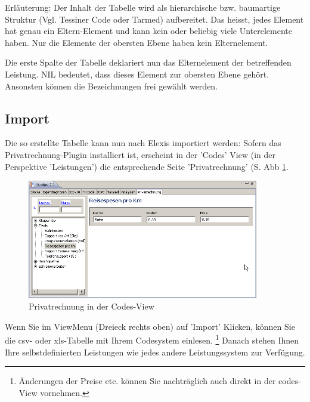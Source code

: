 \documentclass[a4paper]{scrartcl}
\begin{document}
\medskip

Erläuterung: Der Inhalt der Tabelle wird als hierarchische bzw. baumartige Struktur (Vgl. Tessiner Code oder Tarmed) aufbereitet. Das heisst, jedes Element hat genau ein Eltern-Element und kann kein oder beliebig viele Unterelemente haben. Nur die Elemente der obersten Ebene haben kein Elternelement.

Die erste Spalte der Tabelle deklariert nun das Elternelement der betreffenden Leistung. NIL bedeutet, dass dieses Element zur obersten Ebene gehört. Ansonsten können die Bezeichnungen frei gewählt werden.

\subsection{Import}
Die so erstellte Tabelle kann nun nach Elexis importiert werden: Sofern das Privatrechnung-Plugin installiert ist, erscheint in der 'Codes' View (in der Perspektive 'Leistungen') die entsprechende Seite 'Privatrechnung' (S. Abb \ref{fig:privatrechnung1}.

\begin{figure}
  \center
  \includegraphics[width=0.9\textwidth]{privatrechnung1}
  \caption{Privatrechnung in der Codes-View}\label{fig:privatrechnung1}
\end{figure}

Wenn Sie im ViewMenu (Dreieck rechts oben) auf 'Import' Klicken, können Sie die csv- oder xls-Tabelle mit Ihrem Codesystem einlesen. \footnote{Änderungen der Preise etc. können Sie nachträglich auch direkt in der codes-View vornehmen.} Danach stehen Ihnen Ihre selbstdefinierten Leistungen wie jedes andere Leistungssystem zur Verfügung.
\end{document}
